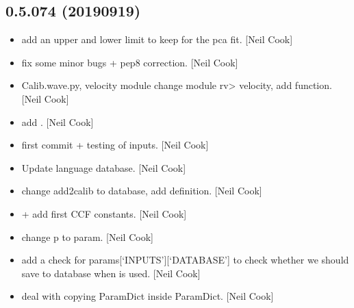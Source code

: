 \documentclass[a4paper,10pt,english]{report}
\begin{document}
\subsection{0.5.074 (2019\sphinxhyphen{}09\sphinxhyphen{}19)}
\label{\detokenize{misc/changelog:id87}}\begin{itemize}
\item {} 
 \sphinxhyphen{} add an upper and lower limit to keep for
the pca fit. {[}Neil Cook{]}

\item {} 
 \sphinxhyphen{} fix some minor bugs + pep8 correction.
{[}Neil Cook{]}

\item {} 
Calib.wave.py, velocity module \sphinxhyphen{} change module rv\textendash{}\textgreater{} velocity, add
 function. {[}Neil Cook{]}

\item {} 
 \sphinxhyphen{} add . {[}Neil Cook{]}

\item {} 
 \sphinxhyphen{} first commit + testing of inputs.
{[}Neil Cook{]}

\item {} 
Update language database. {[}Neil Cook{]}

\item {} 
 \sphinxhyphen{} change \textendash{}add2calib to
\textendash{}database, add  definition. {[}Neil Cook{]}

\item {} 
 +  \sphinxhyphen{} add
first CCF constants. {[}Neil Cook{]}

\item {} 
 \sphinxhyphen{} change p to param. {[}Neil Cook{]}

\item {} 
 \sphinxhyphen{} add a check for
params{[}‘INPUTS’{]}{[}‘DATABASE’{]} to check whether we should save to
database when  is used. {[}Neil Cook{]}

\item {} 
 \sphinxhyphen{} deal with copying ParamDict inside
ParamDict. {[}Neil Cook{]}


\end{itemize}
\end{document}
